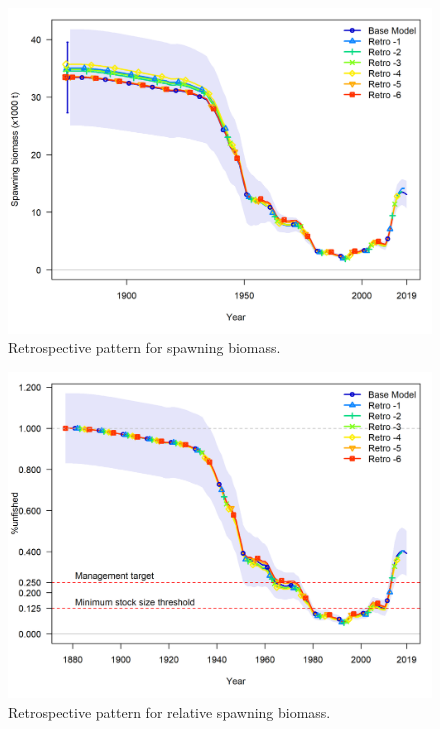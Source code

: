 \documentclass[12pt,]{article}
\begin{document}
\FloatBarrier

\begin{figure}
\centering
\includegraphics{Figures/retro_ssb_5.png}
\caption{Retrospective pattern for spawning biomass.
\label{fig:retro_ssb}}
\end{figure}

\FloatBarrier

\begin{figure}
\centering
\includegraphics{Figures/retro_depl_5.png}
\caption{Retrospective pattern for relative spawning biomass.
\label{fig:retro_depl}}
\end{figure}

\FloatBarrier
\end{document}
